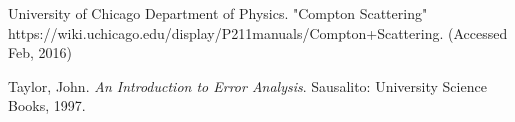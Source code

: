 \documentclass{article}
\begin{document}
\begin{thebibliography}{10}

		University of Chicago Department of Physics. "Compton Scattering"\\
		https://wiki.uchicago.edu/display/P211manuals/Compton+Scattering. (Accessed Feb, 2016)

		Taylor, John. \emph{An Introduction to Error Analysis}. Sausalito: University Science Books, 1997.
		
\end{thebibliography}
\end{document}
